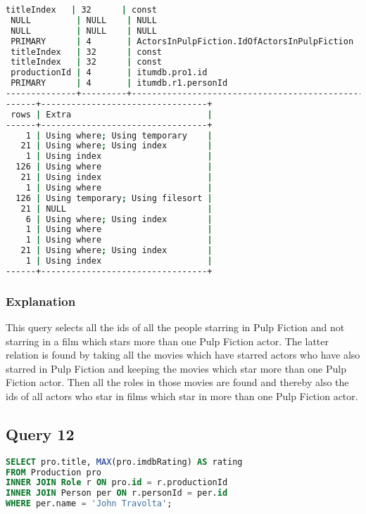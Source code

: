 \begin{lstlisting}[language=bash]
 titleIndex   | 32      | const                                              |
 NULL         | NULL    | NULL                                               |
 NULL         | NULL    | NULL                                               |
 PRIMARY      | 4       | ActorsInPulpFiction.IdOfActorsInPulpFiction        |
 titleIndex   | 32      | const                                              |
 titleIndex   | 32      | const                                              |
 productionId | 4       | itumdb.pro1.id                                     |
 PRIMARY      | 4       | itumdb.r1.personId                                 |
--------------+---------+----------------------------------------------------+
------+---------------------------------+
 rows | Extra                           |
------+---------------------------------+
    1 | Using where; Using temporary    |
   21 | Using where; Using index        |
    1 | Using index                     |
  126 | Using where                     |
   21 | Using index                     |
    1 | Using where                     |
  126 | Using temporary; Using filesort |
   21 | NULL                            |
    6 | Using where; Using index        |
    1 | Using where                     |
    1 | Using where                     |
   21 | Using where; Using index        |
    1 | Using index                     |
------+---------------------------------+

\end{lstlisting}

\subsubsection{Explanation}
This query selects all the ids of all the people starring in Pulp Fiction and not starring in a film which stars more than one Pulp Fiction actor. The latter relation is found by taking all the movies which have starred actors who have also starred in Pulp Fiction and keeping the movies which star more than one Pulp Fiction actor. Then all the roles in those movies are found and thereby also the ids of all actors who star in films which star in more than one Pulp Fiction actor.


\subsection{Query 12}
\begin{lstlisting}[language=sql]
SELECT pro.title, MAX(pro.imdbRating) AS rating
FROM Production pro
INNER JOIN Role r ON pro.id = r.productionId
INNER JOIN Person per ON r.personId = per.id
WHERE per.name = 'John Travolta';
\end{lstlisting}

